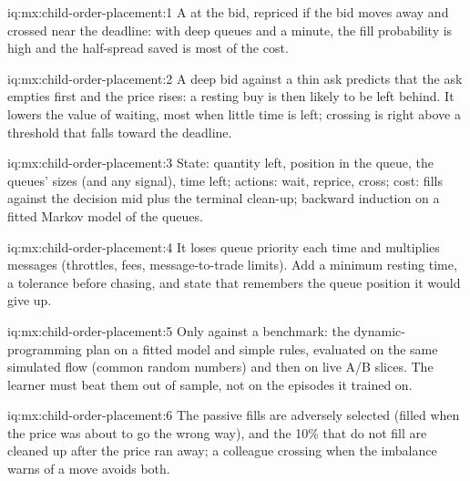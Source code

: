 \begin{solution}{iq:mx:child-order-placement:1}
A  at the bid, repriced if the bid moves away and crossed near the deadline: with deep queues and a minute, the fill probability is high
and the half-spread saved is most of the cost.
\end{solution}

\begin{solution}{iq:mx:child-order-placement:2}
A deep bid against a thin ask predicts that the ask empties first and the price rises: a resting buy is then likely to be left behind. It lowers the
value of waiting, most when little time is left; crossing is right above a threshold that falls toward the deadline.
\end{solution}

\begin{solution}{iq:mx:child-order-placement:3}
State: quantity left, position in the queue, the queues' sizes (and any signal), time left; actions: wait, reprice, cross; cost: fills against the
decision mid plus the terminal clean-up; backward induction on a fitted Markov model of the queues.
\end{solution}

\begin{solution}{iq:mx:child-order-placement:4}
It loses queue priority each time and multiplies messages (throttles, fees, message-to-trade limits). Add a minimum resting time, a tolerance before
chasing, and state that remembers the queue position it would give up.
\end{solution}

\begin{solution}{iq:mx:child-order-placement:5}
Only against a benchmark: the dynamic-programming plan on a fitted model and simple rules, evaluated on the same simulated flow (common random
numbers) and then on live A/B slices. The learner must beat them out of sample, not on the episodes it trained on.
\end{solution}

\begin{solution}{iq:mx:child-order-placement:6}
The passive fills are adversely selected (filled when the price was about to go the wrong way), and the 10\% that do not fill are cleaned up after the
price ran away; a colleague crossing when the imbalance warns of a move avoids both.
\end{solution}
